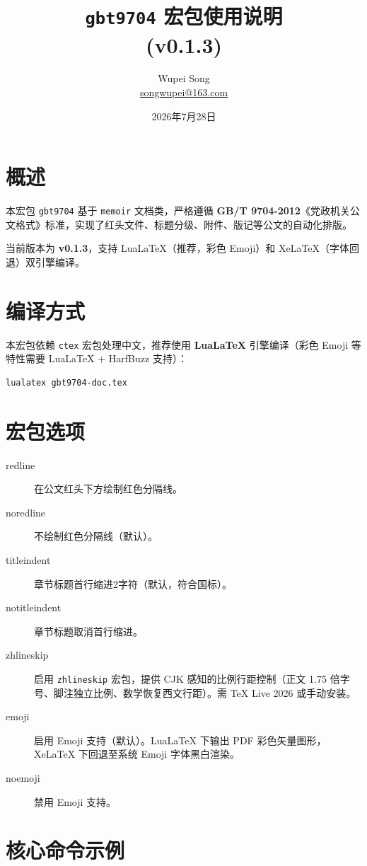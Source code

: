 \documentclass[redline, titleindent, zhlineskip]{gbt9704}
\title{\texttt{gbt9704} 宏包使用说明 \\ (v0.1.3)}
\author{Wupei Song \\ \small{\url{songwupei@163.com}}}
\date{2026年7月28日}
\begin{document}
\maketitle

\tableofcontents

\section{概述}
本宏包 \texttt{gbt9704} 基于 \texttt{memoir} 文档类，严格遵循 \textbf{GB/T 9704-2012}《党政机关公文格式》标准，实现了红头文件、标题分级、附件、版记等公文的自动化排版。

当前版本为 \textbf{v0.1.3}，支持 LuaLaTeX（推荐，彩色 Emoji）和 XeLaTeX（字体回退）双引擎编译。

\section{编译方式}
本宏包依赖 \texttt{ctex} 宏包处理中文，推荐使用 \textbf{LuaLaTeX} 引擎编译（彩色 Emoji 等特性需要 LuaLaTeX + HarfBuzz 支持）：
\begin{verbatim}
lualatex gbt9704-doc.tex
\end{verbatim}

\section{宏包选项}
\begin{description}
  \item[redline] 在公文红头下方绘制红色分隔线。
  \item[noredline] 不绘制红色分隔线（默认）。
  \item[titleindent] 章节标题首行缩进2字符（默认，符合国标）。
  \item[notitleindent] 章节标题取消首行缩进。
  \item[zhlineskip] 启用 \texttt{zhlineskip} 宏包，提供 CJK 感知的比例行距控制（正文 1.75 倍字号、脚注独立比例、数学恢复西文行距）。需 TeX Live 2026 或手动安装。
  \item[emoji] 启用 Emoji 支持（默认）。LuaLaTeX 下输出 PDF 彩色矢量图形，XeLaTeX 下回退至系统 Emoji 字体黑白渲染。
  \item[noemoji] 禁用 Emoji 支持。
\end{description}

\section{核心命令示例}
\end{document}
